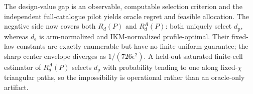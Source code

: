 The design-value gap is an observable, computable selection criterion and the independent full-catalogue pilot yields oracle regret and feasible allocation. The negative side now covers both \(R_d(P)\) and \(R_d^A(P)\): both uniquely select \(d_{\mathrm p}\), whereas \(d_{\mathrm e}\) is arm-normalized and IKM-normalized profile-optimal. Their fixed-law constants are exactly enumerable but have no finite uniform guarantee; the sharp center envelope diverges as \(1/(726\epsilon^2)\). A held-out saturated finite-cell estimator of \(R_d^A(P)\) selects \(d_{\mathrm p}\) with probability tending to one along fixed-\(\chi\) triangular paths, so the impossibility is operational rather than an oracle-only artifact.